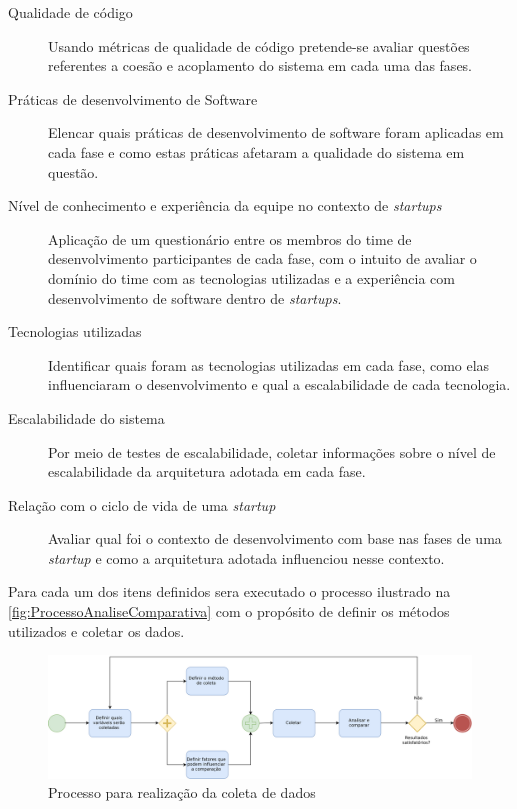     \begin{description}
        \item [Qualidade de código] Usando métricas de qualidade de código pretende-se
        avaliar questões referentes a coesão e acoplamento do sistema em cada uma das
        fases.
        \item [Práticas de desenvolvimento de Software] Elencar quais práticas de
        desenvolvimento de software foram aplicadas em cada fase e como estas práticas
        afetaram a qualidade do sistema em questão.
        \item [Nível de conhecimento e experiência da equipe no contexto de \textit{startups}]
        Aplicação de um questionário entre os membros do time de desenvolvimento participantes
        de cada fase, com o intuito de avaliar o domínio do time com as tecnologias utilizadas
        e a experiência com desenvolvimento de software dentro de \textit{startups}.
        \item [Tecnologias utilizadas] Identificar quais foram as tecnologias utilizadas em
        cada fase, como elas influenciaram o desenvolvimento e qual a escalabilidade de cada
        tecnologia.
        \item [Escalabilidade do sistema] Por meio de testes de escalabilidade, coletar
        informações sobre o nível de escalabilidade da arquitetura adotada em cada fase.
        \item [Relação com o ciclo de vida de uma \textit{startup}] Avaliar qual foi o
        contexto de desenvolvimento com base nas fases de uma \textit{startup} e como a
        arquitetura adotada influenciou nesse contexto.
    \end{description}

Para cada um dos itens definidos sera executado o processo ilustrado na
\autoref{fig:ProcessoAnaliseComparativa} com o propósito de definir os métodos utilizados
e coletar os dados.

    \begin{figure}[h]
      \caption{Processo para realização da coleta de dados\label{fig:ProcessoAnaliseComparativa}}
      \centering
      \includegraphics[keepaspectratio=true,scale=0.5]{figuras/metodologiaAnalise.eps}
    \end{figure}


